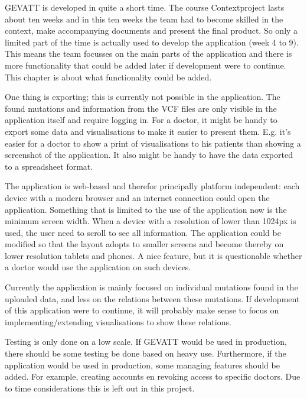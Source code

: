 GEVATT is developed in quite a short time. The course Contextproject lasts about ten weeks and in this ten weeks the team had to become skilled in the context, make accompanying documents and present the final product. So only a limited part of the time is actually used to develop the application (week 4 to 9). This means the team focusses on the main parts of the application and there is more functionality that could be added later if development were to continue. This chapter is about what functionality could be added.

One thing is exporting; this is currently not possible in the application. The found mutations and information from the VCF files are only visible in the application itself and require logging in. For a doctor, it might be handy to export some data and visualisations to make it easier to present them. E.g. it's easier for a doctor to show a print of visualisations to his patients than showing a screenshot of the application. It also might be handy to have the data exported to a spreadsheet format.

The application is web-based and therefor principally platform independent: each device with a modern browser and an internet connection could open the application. Something that is limited to the use of the application now is the minimum screen width. When a device with a resolution of lower than 1024px is used, the user need to scroll to see all information. The application could be modified so that the layout adopts to smaller screens and become thereby on lower resolution tablets and phones. A nice feature, but it is questionable whether a doctor would use the application on such devices.

Currently the application is mainly focused on individual mutations found in the uploaded data, and less on the relations between these mutations. If development of this application were to continue, it will probably make sense to focus on implementing/extending visualisations to show these relations.

Testing is only done on a low scale. If GEVATT would be used in production, there should be some testing be done based on heavy use. Furthermore, if the application would be used in production, some managing features should be added. For example, creating accounts en revoking access to specific doctors. Due to time considerations this is left out in this project.